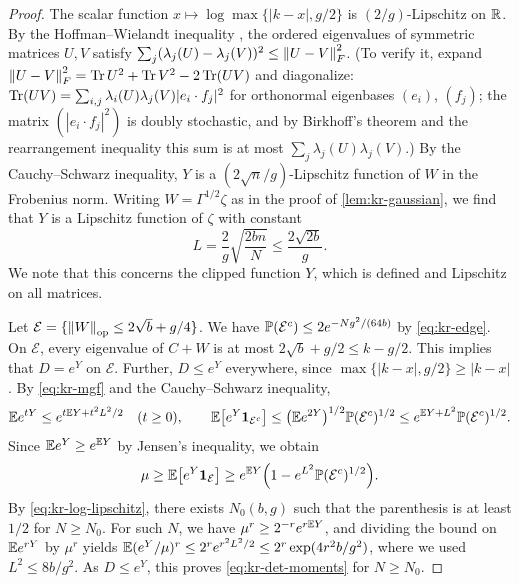 \begin{proof}
The scalar function $x\mapsto\log\max\{|k-x|,g/2\}$ is $(2/g)$-Lipschitz on $\mathbb R$. By the Hoffman--Wielandt inequality \cite{HoffmanWielandt1953}, the ordered eigenvalues of symmetric matrices $U,V$ satisfy $\sum_j(\lambda_j(U)-\lambda_j(V))^2\le\left\lVert U-V\right\rVert_F^2$. (To verify it, expand $\left\lVert U-V\right\rVert_F^2=\operatorname{Tr} U^2+\operatorname{Tr} V^2-2\operatorname{Tr}(UV)$ and diagonalize: $\operatorname{Tr}(UV)=\sum_{i,j}\lambda_i(U)\lambda_j(V)|e_i\cdot f_j|^2$ for orthonormal eigenbases $(e_i)$, $(f_j)$; the matrix $(|e_i\cdot f_j|^2)$ is doubly stochastic, and by Birkhoff's theorem and the rearrangement inequality this sum is at most $\sum_j\lambda_j(U)\lambda_j(V)$.) By the Cauchy--Schwarz inequality, $Y$ is a $(2\sqrt n/g)$-Lipschitz function of $W$ in the Frobenius norm. Writing $W=\Gamma^{1/2}\zeta$ as in the proof of \cref{lem:kr-gaussian}, we find that $Y$ is a Lipschitz function of $\zeta$ with constant
\begin{equation}\label{eq:kr-log-lipschitz}
L=\frac2g\sqrt{\frac{2bn}N}\le\frac{2\sqrt{2b}}g.
\end{equation}
We note that this concerns the clipped function $Y$, which is defined and Lipschitz on all matrices.

Let $\mathcal E=\{\left\lVert W\right\rVert_{\rm op}\le2\sqrt b+g/4\}$. We have $\mathbb P(\mathcal E^c)\le2e^{-Ng^2/(64b)}$ by \eqref{eq:kr-edge}. On $\mathcal E$, every eigenvalue of $C+W$ is at most $2\sqrt b+g/2\le k-g/2$. This implies that $D=e^Y$ on $\mathcal E$. Further, $D\le e^Y$ everywhere, since $\max\{|k-x|,g/2\}\ge|k-x|$. By \eqref{eq:kr-mgf} and the Cauchy--Schwarz inequality,
\[
\mathbb E e^{tY}\le e^{t\mathbb E Y+t^2L^2/2}\quad(t\ge0),\qquad \mathbb E\big[e^Y\mathbf 1_{\mathcal E^c}\big]\le\big(\mathbb E e^{2Y}\big)^{1/2}\mathbb P(\mathcal E^c)^{1/2}\le e^{\mathbb E Y+L^2}\mathbb P(\mathcal E^c)^{1/2}.
\]
Since $\mathbb E e^Y\ge e^{\mathbb E Y}$ by Jensen's inequality, we obtain
\begin{equation}\label{eq:kr-det-lower}
\mu\ge\mathbb E\big[e^Y\mathbf 1_{\mathcal E}\big]\ge e^{\mathbb E Y}\Big(1-e^{L^2}\mathbb P(\mathcal E^c)^{1/2}\Big).
\end{equation}
By \eqref{eq:kr-log-lipschitz}, there exists $N_0(b,g)$ such that the parenthesis is at least $1/2$ for $N\ge N_0$. For such $N$, we have $\mu^r\ge2^{-r}e^{r\mathbb E Y}$, and dividing the bound on $\mathbb E e^{rY}$ by $\mu^r$ yields $\mathbb E(e^Y/\mu)^r\le2^re^{r^2L^2/2}\le2^r\exp(4r^2b/g^2)$, where we used $L^2\le8b/g^2$. As $D\le e^Y$, this proves \eqref{eq:kr-det-moments} for $N\ge N_0$.


\end{proof}
